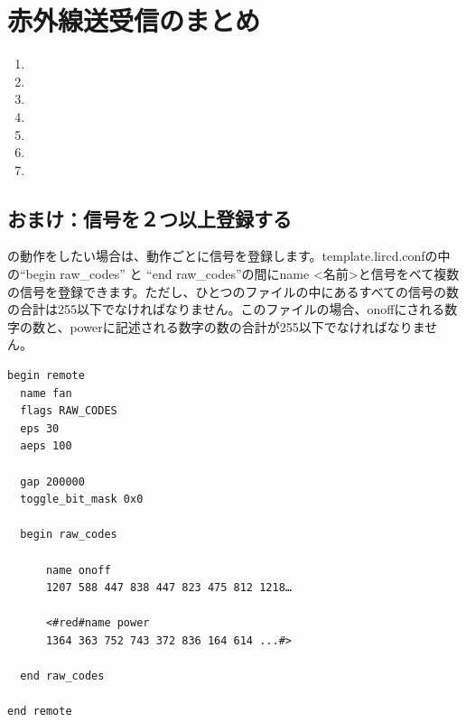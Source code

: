 \documentclass[text05.tex]{subfiles}
\begin{document}
\newpage
\section{赤外線送受信のまとめ}
\begin{enumerate}
\item {}
\item {}
\item {}
\item {}
\item {}
\item {}
\item {}
\end{enumerate}

\begin{tcolorbox}[title=\useOmetoi]
\begin{enumerate}
\end{enumerate}
\end{tcolorbox}

\newpage
\subsection{おまけ：信号を２つ以上登録する}
の動作をしたい場合は、動作ごとに信号を登録します。template.lircd.confの中の“begin raw\_codes” と “end raw\_codes”の間にname <名前>と信号をべて複数の信号を登録できます。ただし、ひとつのファイルの中にあるすべての信号の数の合計は255以下でなければなりません。このファイルの場合、onoffにされる数字の数と、powerに記述される数字の数の合計が255以下でなければなりません。\\

\begin{lstlisting}[caption=２つの信号を登録するときのtemplate.lircd.comf,label=２つの信号を登録するときのtemplate.lircd.comf]
begin remote
  name fan
  flags RAW_CODES
  eps 30
  aeps 100

  gap 200000
  toggle_bit_mask 0x0

  begin raw_codes

      name onoff
      1207 588 447 838 447 823 475 812 1218…

      <#red#name power
      1364 363 752 743 372 836 164 614 ...#>

  end raw_codes

end remote
\end{lstlisting}
\end{document}
